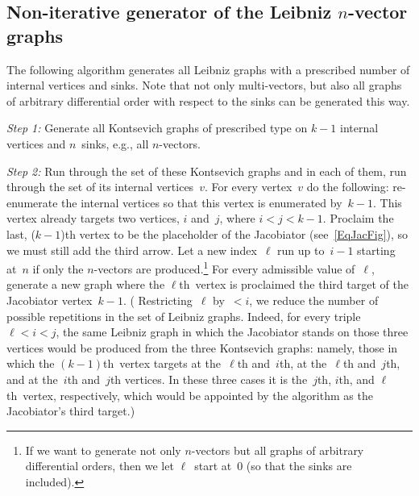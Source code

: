 \documentclass[a4paper]{jpconf}%
\theoremstyle{definition}
\theoremstyle{remark}
\begin{document}
\subsection{\textbf{Non\/-\/iterative generator of the Leibniz $n$\/-\/vector graphs}}
The following algorithm generates all Leibniz graphs with a prescribed number of internal vertices and sinks. %
{Note that not only multi\/-\/vectors, but also all graphs of arbitrary differential order with respect to the sinks can be generated this way.}

\smallskip\noindent%
{\textit{Step 1:}} Generate all Kontsevich graphs of prescribed type on $k-1$ internal vertices and $n$~sinks, e.g., all $n$\/-\/vectors.

\noindent%
{\textit{Step 2:}} Run through the set of these Kontsevich graphs and in each of them, run through the set of its internal vertices~$v$.
For every vertex~$v$ %
do the following: re\/-\/enumerate the internal vertices so that this vertex is enumerated by~$k-1$.
This %
vertex already targets two %
vertices, $i$ and~$j$, where $i<j<k-1$.
Proclaim the last, ($k-1$)th vertex to be the placeholder of the Jacobiator 
(see~\eqref{EqJacFig}), so we must still add the third arrow.
Let a new index~$\ell$ run up to~$i-1$ starting at~$n$ if %
only the $n$\/-\/vectors are produced.\footnote{%
If we want to generate not only $n$\/-\/vectors but all graphs of arbitrary differential orders, then we let $\ell$~start at~$0$ (so that the sinks are included).}
For every admissible value of~$\ell$, generate a new graph where the $\ell$th~vertex is proclaimed the third target of the Jacobiator vertex~$k-1$.
(%
Restricting~$\ell$ by~$<i$, we reduce the number of possible repetitions in the set of Leibniz graphs. Indeed, for every triple $\ell<i<j$, the same Leibniz graph in which the Jacobiator stands on those three vertices would be produced from the three Kontsevich graphs: namely, those in which the $(k-1)$th~vertex targets at the~$\ell$th and~$i$th, at the~$\ell$th and~$j$th, and at the~$i$th and~$j$th vertices. 
In these three cases it is the~$j$th, $i$th, and $\ell$th~vertex, respectively, which would be appointed by the algorithm as the Jacobiator's third target.)
\end{document}
